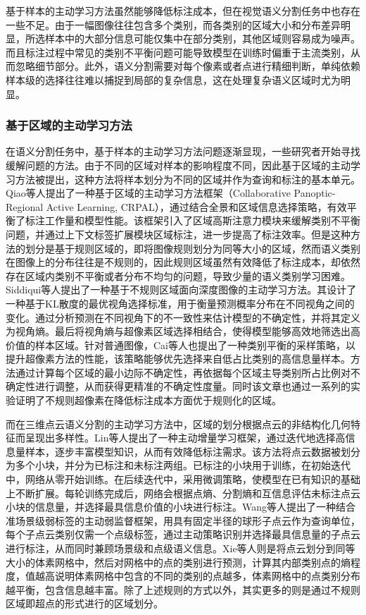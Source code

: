 基于样本的主动学习方法虽然能够降低标注成本，但在视觉语义分割任务中也存在一些不足。由于一幅图像往往包含多个类别，而各类别的区域大小和分布差异明显，所选样本中的大部分信息可能仅集中在部分类别，其他区域则容易成为噪声。而且标注过程中常见的类别不平衡问题可能导致模型在训练时偏重于主流类别，从而忽略细节部分。此外，语义分割需要对每个像素或者点进行精细判断，单纯依赖样本级的选择往往难以捕捉到局部的复杂信息，这在处理复杂语义区域时尤为明显。

\subsubsection{基于区域的主动学习方法}
在语义分割任务中，基于样本的主动学习方法问题逐渐显现，一些研究者开始寻找缓解问题的方法。由于不同的区域对样本的影响程度不同，因此基于区域的主动学习方法被提出，这种方法将样本划分为不同的区域并作为查询和标注的基本单元。Qiao等人提出了一种基于区域的主动学习方法框架（Collaborative Panoptic-Regional Active Learning, CRPAL），通过结合全景和区域信息选择策略，有效平衡了标注工作量和模型性能。该框架引入了区域高斯注意力模块来缓解类别不平衡问题，并通过上下文标签扩展模块区域标注，进一步提高了标注效率。但是这种方法的划分是基于规则区域的，即将图像规则划分为同等大小的区域，然而语义类别在图像上的分布往往是不规则的，因此规则区域虽然有效降低了标注成本，却依然存在区域内类别不平衡或者分布不均匀的问题，导致少量的语义类别学习困难。Siddiqui等人提出了一种基于不规则区域面向深度图像的主动学习方法。其设计了一种基于KL散度的最优视角选择标准，用于衡量预测概率分布在不同视角之间的变化。通过分析预测在不同视角下的不一致性来估计模型的不确定性，并将其定义为视角熵。最后将视角熵与超像素区域选择相结合，使得模型能够高效地筛选出高价值的样本区域。针对普通图像，Cai等人也提出了一种类别平衡的采样策略，以提升超像素方法的性能，该策略能够优先选择来自低占比类别的高信息量样本。方法通过计算每个区域的最小边际不确定性，再依据每个区域主导类别所占比例对不确定性进行调整，从而获得更精准的不确定性度量。同时该文章也通过一系列的实验证明了不规则超像素在降低标注成本方面优于规则化的区域。

而在三维点云语义分割的主动学习方法中，区域的划分根据点云的非结构化几何特征而呈现出多样性。Lin等人提出了一种主动增量学习框架，通过迭代地选择高信息量样本，逐步丰富模型知识，从而有效降低标注需求。该方法将点云数据被划分为多个小块，并分为已标注和未标注两组。已标注的小块用于训练，在初始迭代中，网络从零开始训练。在后续迭代中，采用微调策略，使模型在已有知识的基础上不断扩展。每轮训练完成后，网络会根据点熵、分割熵和互信息评估未标注点云小块的信息量，并选择最具信息价值的小块进行标注。Wang等人提出了一种结合准场景级弱标签的主动弱监督框架，用具有固定半径的球形子点云作为查询单位，每个子点云类别仅需一个点级标签，通过主动策略识别并选择最具信息量的子点云进行标注，从而同时兼顾场景级和点级语义信息。Xie等人则是将点云划分到同等大小的体素网格中，然后对网格中的点的类别进行预测，计算其内部类别点的熵程度，值越高说明体素网格中包含的不同的类别的点越多，体素网格中的点类别分布越平衡，包含信息越丰富。除了上述规则的方式以外，其实更多的则是通过不规则区域即超点的形式进行的区域划分。

